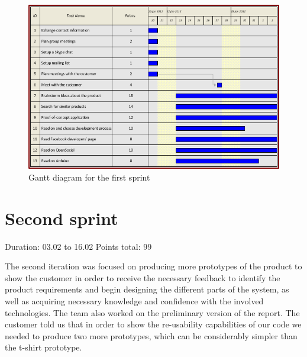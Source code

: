 \begin{figure}[h!]
\centering \includegraphics[scale=0.8]{img/sprints-gantt1.png}
\caption{Gantt diagram for the first sprint}
\label{fig:sprints-gantt1}
\end{figure}

\newpage


\section{Second sprint}

Duration: 03.02 to 16.02
Points total: 99

The second iteration was focused on producing more prototypes of the product to
show the customer in order to receive the necessary feedback to identify
the product requirements and begin designing the different parts of the system,
as well as acquiring necessary knowledge and confidence with the involved
technologies. The team also worked on the preliminary version of the report.
The customer told us that in order to show the re-usability capabilities of
our code we needed to produce two more prototypes, which can be considerably
simpler than the t-shirt prototype.

